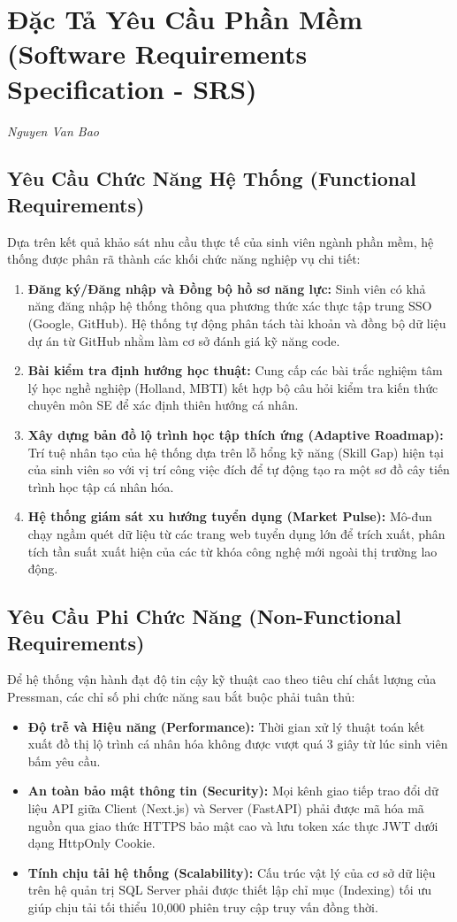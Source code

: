\chapter{Đặc Tả Yêu Cầu Phần Mềm (Software Requirements Specification - SRS)}
\label{ch:srs_spec}
\textit{Nguyen Van Bao}

\section{Yêu Cầu Chức Năng Hệ Thống (Functional Requirements)}
Dựa trên kết quả khảo sát nhu cầu thực tế của sinh viên ngành phần mềm, hệ thống được phân rã thành các khối chức năng nghiệp vụ chi tiết:

\begin{enumerate}[label=\textbf{FR-\arabic*}]
	\item \textbf{Đăng ký/Đăng nhập và Đồng bộ hồ sơ năng lực:} Sinh viên có khả năng đăng nhập hệ thống thông qua phương thức xác thực tập trung SSO (Google, GitHub). Hệ thống tự động phân tách tài khoản và đồng bộ dữ liệu dự án từ GitHub nhằm làm cơ sở đánh giá kỹ năng code.
	\item \textbf{Bài kiểm tra định hướng học thuật:} Cung cấp các bài trắc nghiệm tâm lý học nghề nghiệp (Holland, MBTI) kết hợp bộ câu hỏi kiểm tra kiến thức chuyên môn SE để xác định thiên hướng cá nhân.
	\item \textbf{Xây dựng bản đồ lộ trình học tập thích ứng (Adaptive Roadmap):} Trí tuệ nhân tạo của hệ thống dựa trên lỗ hổng kỹ năng (Skill Gap) hiện tại của sinh viên so với vị trí công việc đích để tự động tạo ra một sơ đồ cây tiến trình học tập cá nhân hóa.
	\item \textbf{Hệ thống giám sát xu hướng tuyển dụng (Market Pulse):} Mô-đun chạy ngầm quét dữ liệu từ các trang web tuyển dụng lớn để trích xuất, phân tích tần suất xuất hiện của các từ khóa công nghệ mới ngoài thị trường lao động.
\end{enumerate}

\section{Yêu Cầu Phi Chức Năng (Non-Functional Requirements)}
Để hệ thống vận hành đạt độ tin cậy kỹ thuật cao theo tiêu chí chất lượng của Pressman, các chỉ số phi chức năng sau bắt buộc phải tuân thủ:
\begin{itemize}
	\item \textbf{Độ trễ và Hiệu năng (Performance):} Thời gian xử lý thuật toán kết xuất đồ thị lộ trình cá nhân hóa không được vượt quá 3 giây từ lúc sinh viên bấm yêu cầu.
	\item \textbf{An toàn bảo mật thông tin (Security):} Mọi kênh giao tiếp trao đổi dữ liệu API giữa Client (Next.js) và Server (FastAPI) phải được mã hóa mã nguồn qua giao thức HTTPS bảo mật cao và lưu token xác thực JWT dưới dạng HttpOnly Cookie.
	\item \textbf{Tính chịu tải hệ thống (Scalability):} Cấu trúc vật lý của cơ sở dữ liệu trên hệ quản trị SQL Server phải được thiết lập chỉ mục (Indexing) tối ưu giúp chịu tải tối thiểu 10,000 phiên truy cập truy vấn đồng thời.
\end{itemize}